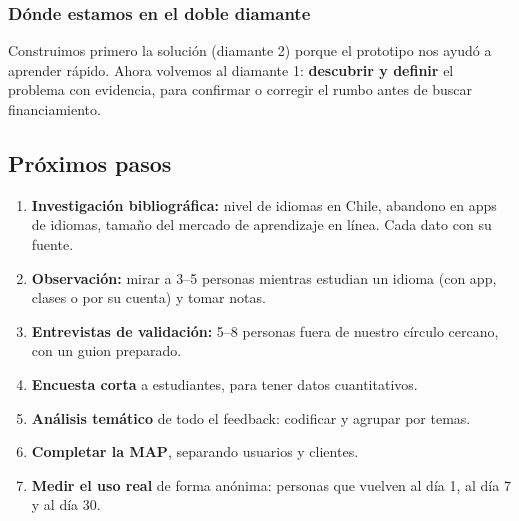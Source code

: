 \subsubsection{Dónde estamos en el doble diamante}
Construimos primero la solución (diamante 2) porque el prototipo nos ayudó a aprender rápido. Ahora
volvemos al diamante 1: \textbf{descubrir y definir} el problema con evidencia, para confirmar o
corregir el rumbo antes de buscar financiamiento.

\subsection{Próximos pasos}
\begin{enumerate}
  \item \textbf{Investigación bibliográfica:} nivel de idiomas en Chile, abandono en apps de idiomas,
        tamaño del mercado de aprendizaje en línea. Cada dato con su fuente.
  \item \textbf{Observación:} mirar a 3–5 personas mientras estudian un idioma (con app, clases o por su cuenta) y tomar notas.
  \item \textbf{Entrevistas de validación:} 5–8 personas fuera de nuestro círculo cercano, con un guion preparado.
  \item \textbf{Encuesta corta} a estudiantes, para tener datos cuantitativos.
  \item \textbf{Análisis temático} de todo el feedback: codificar y agrupar por temas.
  \item \textbf{Completar la MAP}, separando usuarios y clientes.
  \item \textbf{Medir el uso real} de forma anónima: personas que vuelven al día 1, al día 7 y al día 30.
\end{enumerate}
